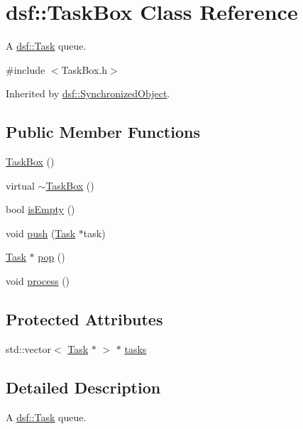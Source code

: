 \hypertarget{classdsf_1_1_task_box}{}\section{dsf\+:\+:Task\+Box Class Reference}
\label{classdsf_1_1_task_box}


A \hyperlink{classdsf_1_1_task}{dsf\+::\+Task} queue.  




{\ttfamily \#include $<$Task\+Box.\+h$>$}



Inherited by \hyperlink{classdsf_1_1_synchronized_object}{dsf\+::\+Synchronized\+Object}.

\subsection*{Public Member Functions}
\begin{DoxyCompactItemize}
\item 
\hyperlink{classdsf_1_1_task_box_a931c925e0a4956ee6bc1674f43ecc0a0}{Task\+Box} ()
\item 
virtual \hyperlink{classdsf_1_1_task_box_a3445ee5ebd0141d317d8fe0a00b07d1c}{$\sim$\+Task\+Box} ()
\item 
bool \hyperlink{classdsf_1_1_task_box_a7e67fd9b7104d24cb4be54f6a48eb8c9}{is\+Empty} ()
\item 
void \hyperlink{classdsf_1_1_task_box_a0ec4e52a625fae00e05b072d6434eef1}{push} (\hyperlink{classdsf_1_1_task}{Task} $\ast$task)
\item 
\hyperlink{classdsf_1_1_task}{Task} $\ast$ \hyperlink{classdsf_1_1_task_box_a4dd2eb0544472b8250037d0014ad71f4}{pop} ()
\item 
void \hyperlink{classdsf_1_1_task_box_ad35070ac305146aaa4073b2078d9209e}{process} ()
\end{DoxyCompactItemize}
\subsection*{Protected Attributes}
\begin{DoxyCompactItemize}
\item 
std\+::vector$<$ \hyperlink{classdsf_1_1_task}{Task} $\ast$ $>$ $\ast$ \hyperlink{classdsf_1_1_task_box_ae13d0d245cacbf7f4019f7ff5486aa79}{tasks}
\end{DoxyCompactItemize}


\subsection{Detailed Description}
A \hyperlink{classdsf_1_1_task}{dsf\+::\+Task} queue. 

